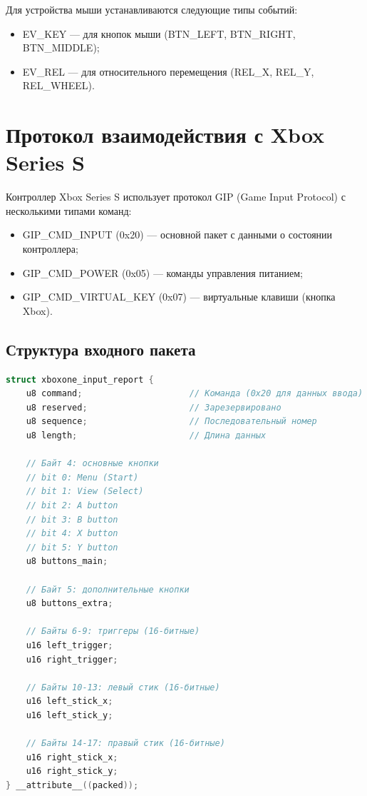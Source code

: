 Для устройства мыши устанавливаются следующие типы событий:
\begin{itemize}[label=---]
    \item EV\_KEY — для кнопок мыши (BTN\_LEFT, BTN\_RIGHT, BTN\_MIDDLE);
    \item EV\_REL — для относительного перемещения (REL\_X, REL\_Y, REL\_WHEEL).
\end{itemize}

\section{Протокол взаимодействия с Xbox Series S}

Контроллер Xbox Series S использует протокол GIP (Game Input Protocol) с несколькими типами команд:
\begin{itemize}[label=---]
    \item GIP\_CMD\_INPUT (0x20) — основной пакет с данными о состоянии контроллера;
    \item GIP\_CMD\_POWER (0x05) — команды управления питанием;
    \item GIP\_CMD\_VIRTUAL\_KEY (0x07) — виртуальные клавиши (кнопка Xbox).
\end{itemize}

\subsection{Структура входного пакета}

\begin{lstlisting}[label=lst:xbox_packet,caption=Структура пакета Xbox Series S,language=c]
struct xboxone_input_report {
    u8 command;                     // Команда (0x20 для данных ввода)
    u8 reserved;                    // Зарезервировано
    u8 sequence;                    // Последовательный номер
    u8 length;                      // Длина данных
    
    // Байт 4: основные кнопки
    // bit 0: Menu (Start)
    // bit 1: View (Select)
    // bit 2: A button
    // bit 3: B button
    // bit 4: X button
    // bit 5: Y button
    u8 buttons_main;
    
    // Байт 5: дополнительные кнопки
    u8 buttons_extra;
    
    // Байты 6-9: триггеры (16-битные)
    u16 left_trigger;
    u16 right_trigger;
    
    // Байты 10-13: левый стик (16-битные)
    u16 left_stick_x;
    u16 left_stick_y;
    
    // Байты 14-17: правый стик (16-битные)
    u16 right_stick_x;
    u16 right_stick_y;
} __attribute__((packed));
\end{lstlisting}

